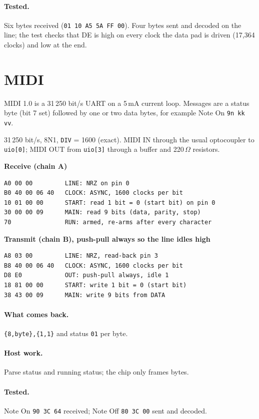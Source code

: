 \documentclass[11pt,a4paper]{article}
\newcommand{\sig}[1]{\texttt{#1}}
\newcommand{\progtitle}[1]{\par\smallskip\textbf{\small\color{accent}#1}\par\nopagebreak}
\newcommand{\facts}[1]{\par\noindent\colorbox{codebg}{\parbox{\dimexpr\linewidth-2\fboxsep}{\small #1}}\par}
\begin{document}
\paragraph{Tested.} Six bytes received (\texttt{01 10 A5 5A FF 00}). Four bytes sent and decoded on the line; the test checks that DE is high on every clock the data pad is driven (17,364 clocks) and low at the end.
\section{MIDI}
MIDI 1.0 is a 31\,250 bit/s UART on a 5\,mA current loop. Messages are a status byte (bit 7 set) followed by one or two data bytes, for example Note On \texttt{9n kk vv}.
\facts{31\,250 bit/s, 8N1, \sig{DIV} = 1600 (exact). MIDI IN through the usual optocoupler to \sig{uio[0]}; MIDI OUT from \sig{uio[3]} through a buffer and 220\,$\Omega$ resistors.}
\progtitle{Receive (chain A)}
\begin{lstlisting}
A0 00 00         LINE: NRZ on pin 0
B0 40 00 06 40   CLOCK: ASYNC, 1600 clocks per bit
10 01 00 00      START: read 1 bit = 0 (start bit) on pin 0
30 00 00 09      MAIN: read 9 bits (data, parity, stop)
70               RUN: armed, re-arms after every character
\end{lstlisting}
\progtitle{Transmit (chain B), push-pull always so the line idles high}
\begin{lstlisting}
A8 03 00         LINE: NRZ, read-back pin 3
B8 40 00 06 40   CLOCK: ASYNC, 1600 clocks per bit
D8 E0            OUT: push-pull always, idle 1
18 81 00 00      START: write 1 bit = 0 (start bit)
38 43 00 09      MAIN: write 9 bits from DATA
\end{lstlisting}
\paragraph{What comes back.} \texttt{\{8,byte\},\{1,1\}} and status \texttt{01} per byte.

\paragraph{Host work.} Parse status and running status; the chip only frames bytes.

\paragraph{Tested.} Note On \texttt{90 3C 64} received; Note Off \texttt{80 3C 00} sent and decoded.
\end{document}
